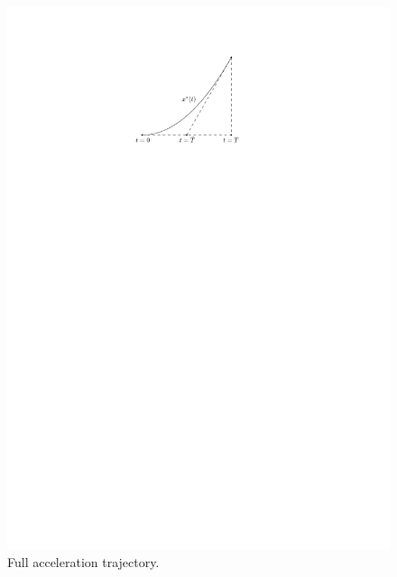 \documentclass[a4paper]{article}
\theoremstyle{definition}
\theoremstyle{plain}
\begin{document}
\begin{figure}[t]
  \centering
  \includegraphics[scale=1]{figures/motion/acceleration}
  \caption{Full acceleration trajectory.}
  \label{fig:acceleration}
\end{figure}
\end{document}
